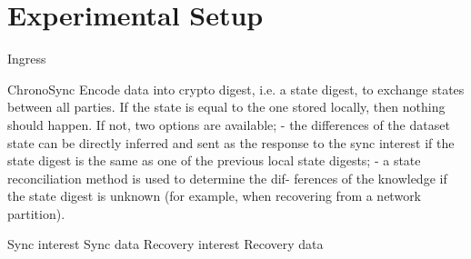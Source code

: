 \chapter{Experimental Setup}\label{chp:experimental_setup}
Ingress

ChronoSync
Encode data into crypto digest, i.e. a state digest, to exchange states between all parties. 
If the state is equal to the one stored locally, then nothing should happen.
If not, two options are available; 
- the differences of the dataset state can be directly inferred
and sent as the response to the sync interest if the state
digest is the same as one of the previous local state
digests;
- a state reconciliation method is used to determine the dif-
ferences of the knowledge if the state digest is unknown
(for example, when recovering from a network partition).

Sync interest
Sync data
Recovery interest
Recovery data